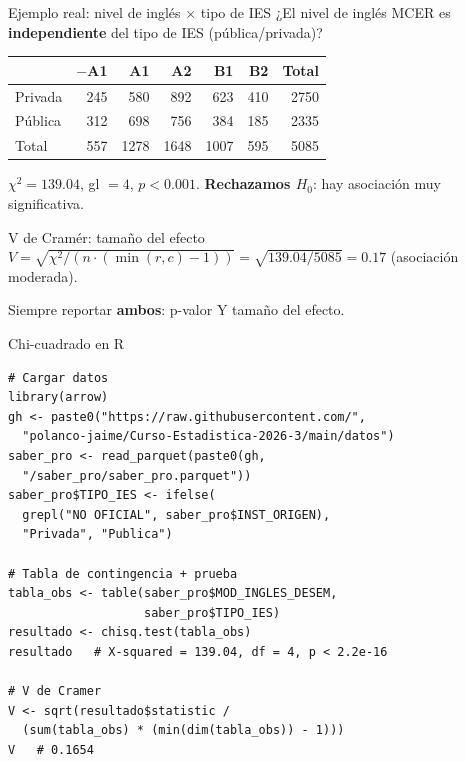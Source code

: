 \documentclass[aspectratio=169, 11pt]{beamer}
\begin{document}

\begin{frame}{Ejemplo real: nivel de inglés $\times$ tipo de IES}
\small
¿El nivel de inglés MCER es \textbf{independiente} del tipo de IES (pública/privada)?

\vspace{0.2cm}
\begin{center}
\footnotesize
\begin{tabular}{lrrrrrr}
\toprule
& $-$A1 & A1 & A2 & B1 & B2 & Total \\
\midrule
Privada & 245 & 580 & 892 & 623 & 410 & 2750 \\
Pública & 312 & 698 & 756 & 384 & 185 & 2335 \\
\midrule
Total & 557 & 1278 & 1648 & 1007 & 595 & 5085 \\
\bottomrule
\end{tabular}
\end{center}

\vspace{0.2cm}
$\chi^2 = 139.04$, gl $= 4$, $p < 0.001$. \textbf{Rechazamos $H_0$}: hay asociación muy significativa.

\vspace{0.1cm}
\begin{block}{V de Cramér: tamaño del efecto}
$V = \sqrt{\chi^2 / (n \cdot (\min(r,c)-1))} = \sqrt{139.04 / 5085} = 0.17$ (asociación moderada).

Siempre reportar \textbf{ambos}: p-valor Y tamaño del efecto.
\end{block}
\end{frame}

\begin{frame}[fragile]{Chi-cuadrado en R}
\begin{lstlisting}[basicstyle=\ttfamily\scriptsize]
# Cargar datos
library(arrow)
gh <- paste0("https://raw.githubusercontent.com/",
  "polanco-jaime/Curso-Estadistica-2026-3/main/datos")
saber_pro <- read_parquet(paste0(gh,
  "/saber_pro/saber_pro.parquet"))
saber_pro$TIPO_IES <- ifelse(
  grepl("NO OFICIAL", saber_pro$INST_ORIGEN),
  "Privada", "Publica")

# Tabla de contingencia + prueba
tabla_obs <- table(saber_pro$MOD_INGLES_DESEM,
                   saber_pro$TIPO_IES)
resultado <- chisq.test(tabla_obs)
resultado   # X-squared = 139.04, df = 4, p < 2.2e-16

# V de Cramer
V <- sqrt(resultado$statistic /
  (sum(tabla_obs) * (min(dim(tabla_obs)) - 1)))
V   # 0.1654
\end{lstlisting}
\end{frame}
\end{document}

